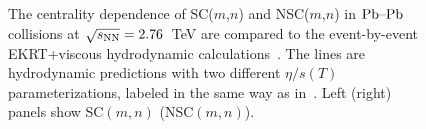 \begin{figure}[!]
            \begin{center}
              \end{center}
        \caption{The centrality dependence of SC($m$,$n$) and NSC($m$,$n$) in $\textnormal{Pb--Pb}$ collisions at $\sqrt{s_{\textnormal{NN}}}=2.76$~TeV are compared to the event-by-event EKRT+viscous hydrodynamic calculations~\cite{Niemi:2015qia}. The lines are hydrodynamic predictions with two different $\eta/s(T)$ parameterizations, labeled in the same way as in~\cite{Niemi:2015qia}. Left (right) panels show SC$(m,n)$ (NSC$(m,n)$).}        
        \label{fig:Figure_3}
\end{figure}

